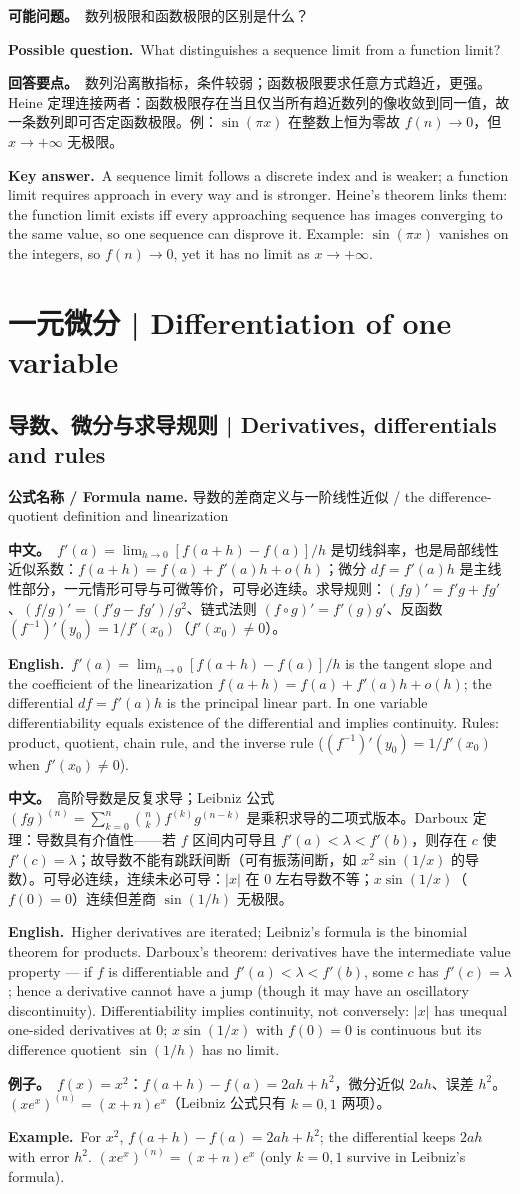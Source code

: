 \documentclass[UTF8,11pt,a4paper]{ctexart}
\newcommand{\BOTH}[2]{\par\noindent\textbf{中文。}\ #1\par\noindent\textbf{English.}\ #2\par}
\newcommand{\EX}[2]{\par\noindent\textbf{例子。}\ #1\par\noindent\textbf{Example.}\ #2\par}
\newcommand{\FORMULA}[2]{\par\noindent\textbf{公式名称 / Formula name.} #1 / #2\par}
\newcommand{\ASK}[4]{\begin{samepage}\par\noindent\textbf{可能问题。}\ #1\par\noindent\textbf{Possible question.}\ #2\par\noindent\textbf{回答要点。}\ #3\par\noindent\textbf{Key answer.}\ #4\medskip\end{samepage}}
\begin{document}
\ASK{数列极限和函数极限的区别是什么？}{What distinguishes a sequence limit from a function limit?}{数列沿离散指标，条件较弱；函数极限要求任意方式趋近，更强。Heine 定理连接两者：函数极限存在当且仅当所有趋近数列的像收敛到同一值，故一条数列即可否定函数极限。例：$\sin(\pi x)$ 在整数上恒为零故 $f(n)\to0$，但 $x\to+\infty$ 无极限。}{A sequence limit follows a discrete index and is weaker; a function limit requires approach in every way and is stronger. Heine's theorem links them: the function limit exists iff every approaching sequence has images converging to the same value, so one sequence can disprove it. Example: $\sin(\pi x)$ vanishes on the integers, so $f(n)\to0$, yet it has no limit as $x\to+\infty$.}

\section{一元微分 | Differentiation of one variable}

\subsection{导数、微分与求导规则 | Derivatives, differentials and rules}
\FORMULA{导数的差商定义与一阶线性近似}{the difference-quotient definition and linearization}
\BOTH{$f'(a)=\lim_{h\to0}[f(a+h)-f(a)]/h$ 是切线斜率，也是局部线性近似系数：$f(a+h)=f(a)+f'(a)h+o(h)$；微分 $df=f'(a)h$ 是主线性部分，一元情形可导与可微等价，可导必连续。求导规则：$(fg)'=f'g+fg'$、$(f/g)'=(f'g-fg')/g^2$、链式法则 $(f\circ g)'=f'(g)g'$、反函数 $(f^{-1})'(y_0)=1/f'(x_0)$（$f'(x_0)\ne0$）。}{$f'(a)=\lim_{h\to0}[f(a+h)-f(a)]/h$ is the tangent slope and the coefficient of the linearization $f(a+h)=f(a)+f'(a)h+o(h)$; the differential $df=f'(a)h$ is the principal linear part. In one variable differentiability equals existence of the differential and implies continuity. Rules: product, quotient, chain rule, and the inverse rule ($(f^{-1})'(y_0)=1/f'(x_0)$ when $f'(x_0)\ne0$).}
\BOTH{高阶导数是反复求导；Leibniz 公式 $(fg)^{(n)}=\sum_{k=0}^n\binom nk f^{(k)}g^{(n-k)}$ 是乘积求导的二项式版本。Darboux 定理：导数具有介值性——若 $f$ 区间内可导且 $f'(a)<\lambda<f'(b)$，则存在 $c$ 使 $f'(c)=\lambda$；故导数不能有跳跃间断（可有振荡间断，如 $x^2\sin(1/x)$ 的导数）。可导必连续，连续未必可导：$|x|$ 在 $0$ 左右导数不等；$x\sin(1/x)$（$f(0)=0$）连续但差商 $\sin(1/h)$ 无极限。}{Higher derivatives are iterated; Leibniz's formula is the binomial theorem for products. Darboux's theorem: derivatives have the intermediate value property — if $f$ is differentiable and $f'(a)<\lambda<f'(b)$, some $c$ has $f'(c)=\lambda$; hence a derivative cannot have a jump (though it may have an oscillatory discontinuity). Differentiability implies continuity, not conversely: $|x|$ has unequal one-sided derivatives at $0$; $x\sin(1/x)$ with $f(0)=0$ is continuous but its difference quotient $\sin(1/h)$ has no limit.}
\EX{$f(x)=x^2$：$f(a+h)-f(a)=2ah+h^2$，微分近似 $2ah$、误差 $h^2$。$(xe^x)^{(n)}=(x+n)e^x$（Leibniz 公式只有 $k=0,1$ 两项）。}{For $x^2$, $f(a+h)-f(a)=2ah+h^2$; the differential keeps $2ah$ with error $h^2$. $(xe^x)^{(n)}=(x+n)e^x$ (only $k=0,1$ survive in Leibniz's formula).}
\end{document}
